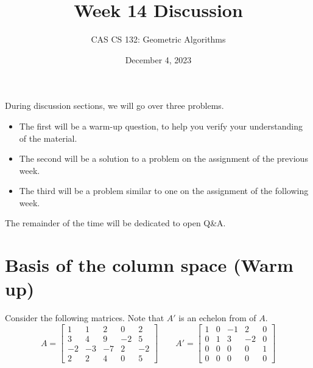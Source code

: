 \documentclass{article}
\title{
  Week 14 Discussion
}
\author{CAS CS 132: Geometric Algorithms}
\date{December 4, 2023}
\theoremstyle{remark}
\begin{document}
\maketitle

\noindent During discussion sections, we will go over three problems.
\begin{itemize}
\item The first will be a warm-up question, to help you verify your understanding of the material.
\item The second will be a solution to a problem on the assignment of the previous week.
\item The third will be a problem similar to one on the assignment of the following week.
\end{itemize}
The remainder of the time will be dedicated to open Q\&A.

\pagebreak
\section{Basis of the column space (Warm up)}

Consider the following matrices. Note that $A'$ is an echelon from of $A$.
\begin{displaymath}
  A =
  \begin{bmatrix}
    1 & 1 & 2 & 0 & 2 \\
    3 & 4 & 9 & -2 & 5 \\
    -2 & -3 & -7 & 2 & -2 \\
    2 & 2 & 4 & 0 & 5
  \end{bmatrix}
  \qquad
  A' =
  \begin{bmatrix}
    1 & 0 & -1 & 2 & 0 \\
    0 & 1 & 3 & -2 & 0 \\
    0 & 0 & 0 & 0 & 1 \\
    0 & 0 & 0 & 0 & 0
  \end{bmatrix}
\end{displaymath}
\end{document}
